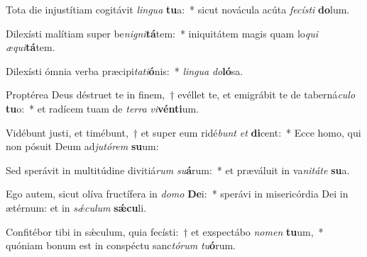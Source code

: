 \item Tota die injustítiam cogitávit \textit{lin}\textit{gua} \textbf{tu}a:~* sicut novácula acúta \textit{fe}\textit{cís}\textit{ti} \textbf{do}lum.
\item Dilexísti malítiam super be\textit{ni}\textit{gni}\textbf{tá}tem:~* iniquitátem magis quam lo\textit{qui} \textit{æ}\textit{qui}\textbf{tá}tem.
\item Dilexísti ómnia verba præcipi\textit{ta}\textit{ti}\textbf{ó}nis:~* \textit{lin}\textit{gua} \textit{do}\textbf{ló}sa.
\item Proptérea Deus déstruet te in finem,~† evéllet te, et emigrábit te de taberná\textit{cu}\textit{lo} \textbf{tu}o:~* et radícem tuam de \textit{ter}\textit{ra} \textit{vi}\textbf{vén}\textbf{ti}um.
\item Vidébunt justi, et timébunt,~† et super eum ridé\textit{bunt} \textit{et} \textbf{di}cent:~* Ecce homo, qui non pósuit Deum ad\textit{ju}\textit{tó}\textit{rem} \textbf{su}um:
\item Sed sperávit in multitúdine divitiá\textit{rum} \textit{su}\textbf{á}rum:~* et præváluit in va\textit{ni}\textit{tá}\textit{te} \textbf{su}a.
\item Ego autem, sicut olíva fructífera in \textit{do}\textit{mo} \textbf{De}i:~* sperávi in misericórdia Dei in ætérnum: et in \textit{sǽ}\textit{cu}\textit{lum} \textbf{sǽ}\textbf{cu}li.
\item Confitébor tibi in sǽculum, quia fecísti:~† et exspectábo \textit{no}\textit{men} \textbf{tu}um,~* quóniam bonum est in conspéctu sanc\textit{tó}\textit{rum} \textit{tu}\textbf{ó}rum.
